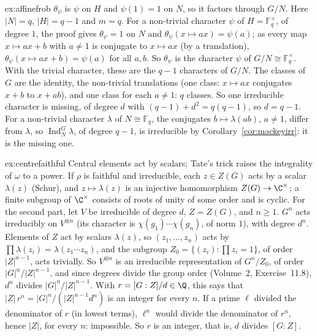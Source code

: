 \begin{solution}{ex:affinefrob}
\idea $\theta_\psi$ is $\psi$ on $H$ and $\psi(1)=1$ on $N$, so it factors through $G/N$.
\writeup Here $|N|=q$, $|H|=q-1$ and $m=q$. For a non-trivial character $\psi$ of $H=\mathbb F_q^\times$, of degree $1$, the proof gives $\theta_\psi=1$ on $N$ and $\theta_\psi(x\mapsto ax)=\psi(a)$; as every map $x\mapsto ax+b$ with $a\ne1$ is
conjugate to $x\mapsto ax$ (by a translation), $\theta_\psi(x\mapsto ax+b)=\psi(a)$ for all $a,b$. So $\theta_\psi$ is the character $\psi$ of $G/N\cong\mathbb F_q^\times$. With the trivial character, these are the $q-1$ characters of $G/N$. The
classes of $G$ are the identity, the non-trivial translations (one class: $x\mapsto ax$ conjugates $x+b$ to $x+ab$), and one class for each $a\ne1$: $q$ classes. So one irreducible character is missing, of degree $d$ with
$(q-1)+d^2=q(q-1)$, so $d=q-1$. For a non-trivial character $\lambda$ of $N\cong\mathbb F_q$, the conjugates $b\mapsto\lambda(ab)$, $a\ne1$, differ from $\lambda$, so $\operatorname{Ind}_N^G\lambda$, of degree $q-1$, is irreducible by
Corollary~\ref{cor:mackeyirr}: it is the missing one.
\end{solution}

\begin{solution}{ex:centrefaithful}
\idea Central elements act by scalars; Tate's trick raises the integrality of $\omega$ to a power.
\writeup If $\rho$ is faithful and irreducible, each $z\in Z(G)$ acts by a scalar $\lambda(z)$ (Schur), and $z\mapsto\lambda(z)$ is an injective homomorphism $Z(G)\to\C^\times$; a finite subgroup of $\C^\times$ consists of roots of unity of
some order and is cyclic. For the second part, let $V$ be irreducible of degree $d$, $Z=Z(G)$, and $n\ge1$. $G^n$ acts irreducibly on $V^{\otimes n}$ (its character is $\chi(g_1)\cdots\chi(g_n)$, of norm $1$), with degree $d^n$.
Elements of $Z$ act by scalars $\lambda(z)$, so $(z_1,\dots,z_n)$ acts by $\prod\lambda(z_i)=\lambda(z_1\cdots z_n)$, and the subgroup $Z_0=\{(z_i):\prod z_i=1\}$, of order $|Z|^{n-1}$, acts trivially. So $V^{\otimes n}$ is an irreducible
representation of $G^n/Z_0$, of order $|G|^n/|Z|^{n-1}$, and since degrees divide the group order (Volume~2, Exercise~11.8), $d^n$ divides $|G|^n/|Z|^{n-1}$. With $r=[G:Z]/d\in\Q$, this says that $|Z|\,r^n=|G|^n/(|Z|^{n-1}d^n)$ is an integer for every $n$. If a prime $\ell$ divided the
denominator of $r$ (in lowest terms), $\ell^n$ would divide the denominator of $r^n$, hence $|Z|$, for every $n$: impossible. So $r$ is an integer, that is, $d$ divides $[G:Z]$.
\end{solution}

